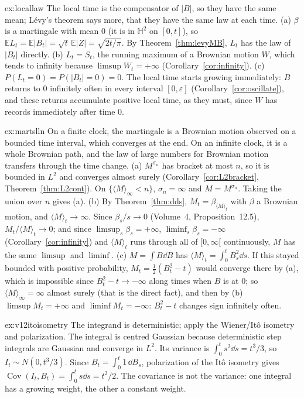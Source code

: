 \begin{solution}{ex:locallaw}
\idea The local time is the compensator of $|B|$, so they have the same mean; L\'evy's theorem says more, that they have the same law at each time.
\writeup (a) $\beta$ is a martingale with mean $0$ (it is in $\mathbb H^2$ on $[0,t]$), so $\mathbb EL_t=\mathbb E|B_t|=\sqrt t\,\mathbb E|Z|=\sqrt{2t/\pi}$. By Theorem~\ref{thm:levyMB}, $L_t$ has the law of $|B_t|$ directly. (b) $L_t=S_t$, the
running maximum of a Brownian motion $W$, which tends to infinity because $\limsup W_t=+\infty$ (Corollary~\ref{cor:infinity}). (c) $P(L_t=0)=P(|B_t|=0)=0$. The local time starts growing immediately: $B$ returns to $0$
infinitely often in every interval $[0,\varepsilon]$ (Corollary~\ref{cor:oscillate}), and these returns accumulate positive local time, as they must, since $W$ has records immediately after time $0$.
\end{solution}

\begin{solution}{ex:martslln}
\idea On a finite clock, the martingale is a Brownian motion observed on a bounded time interval, which converges at the end. On an infinite clock, it is a whole Brownian path, and the law of large numbers for
Brownian motion transfers through the time change.
\writeup (a) $M^{\sigma_n}$ has bracket at most $n$, so it is bounded in $L^2$ and converges almost surely (Corollary~\ref{cor:L2bracket}, Theorem~\ref{thm:L2cont}). On $\{\langle M\rangle_\infty<n\}$, $\sigma_n=\infty$ and $M=M^{\sigma_n}$.
Taking the union over $n$ gives (a). (b) By Theorem~\ref{thm:dds}, $M_t=\beta_{\langle M\rangle_t}$ with $\beta$ a Brownian motion, and $\langle M\rangle_t\to\infty$. Since $\beta_s/s\to0$ (Volume~4, Proposition~12.5), $M_t/\langle M\rangle_t\to0$; and
since $\limsup_s\beta_s=+\infty$, $\liminf_s\beta_s=-\infty$ (Corollary~\ref{cor:infinity}) and $\langle M\rangle_t$ runs through all of $[0,\infty[$ continuously, $M$ has the same $\limsup$ and $\liminf$. (c) $M=\int B\dd B$ has
$\langle M\rangle_t=\int_0^tB_s^2\dd s$. If this stayed bounded with positive probability, $M_t=\frac12(B_t^2-t)$ would converge there by (a), which is impossible since $B_t^2-t\to-\infty$ along times when $B$ is at $0$; so
$\langle M\rangle_\infty=\infty$ almost surely (that is the direct fact), and then by (b) $\limsup M_t=+\infty$ and $\liminf M_t=-\infty$: $B_t^2-t$ changes sign infinitely often.
\end{solution}

\begin{solution}{ex:v12itoisometry}
\idea The integrand is deterministic; apply the Wiener/Itô isometry and polarization.
\writeup The integral is centred Gaussian because deterministic step integrals are Gaussian and converge in $L^2$. Its variance is $\int_0^t s^2\dd s=t^3/3$, so $I_t\sim N(0,t^3/3)$. Since $B_t=\int_0^t1\,\dd B_s$, polarization of the Itô isometry gives $\operatorname{Cov}(I_t,B_t)=\int_0^t s\dd s=t^2/2$. The covariance is not the variance: one integral has a growing weight, the other a constant weight.
\end{solution}

